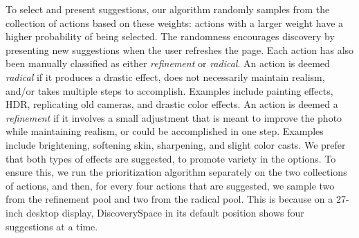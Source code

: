 To select and present suggestions, our algorithm randomly samples from the collection of actions based on these weights: actions with a larger weight have a higher probability of being selected. The randomness encourages discovery by presenting new suggestions when the user refreshes the page. Each action has also been manually classified as either \textit{refinement} or \textit{radical}. An action is deemed \textit{radical} if it produces a drastic effect, does not necessarily maintain realism, and/or takes multiple steps to accomplish. Examples include painting effects, HDR, replicating old cameras, and drastic color effects. An action is deemed a \textit{refinement} if it involves a small adjustment that is meant to improve the photo while maintaining realism, or could be accomplished in one step. Examples include brightening, softening skin, sharpening, and slight color casts. We prefer that both types of effects are suggested, to promote variety in the options. To ensure this, we run the prioritization algorithm separately on the two collections of actions, and then, for every four actions that are suggested, we sample two from the refinement pool and two from the radical pool. This is because on a 27-inch desktop display, Discovery\-Space in its default position shows four suggestions at a time.
